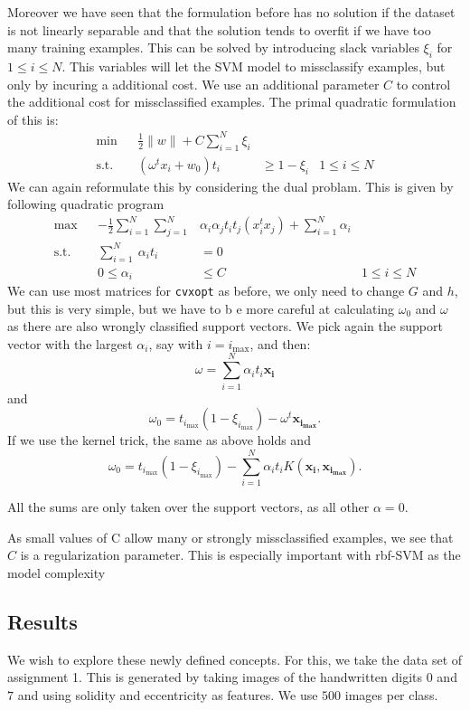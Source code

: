 Moreover we have seen that the formulation before has no solution if the dataset is not linearly separable and that the solution tends to overfit if we have too many training examples. This can be solved by introducing slack variables $\xi_i$ for $1 \leq i \leq N$. This variables will let the SVM model to missclassify examples, but only by incuring a additional cost. We use an additional parameter $C$ to control the additional cost for missclassified examples. The primal quadratic formulation of this is:
\begin{align*}
	\min&&  \frac{1}{2}\lVert w \rVert + C \sum\limits_{i=1}^N \xi_i &\\
	\text{s.t.}&& (\omega^tx_i+w_0)t_i &\geq 1 - \xi_i &1 \leq i \leq N
\end{align*}
We can again reformulate this by considering the dual problam. This is given by following quadratic program
\begin{align*}
	\max&& - \frac{1}{2} \sum\limits_{i=1}^N \sum\limits_{j=1}^N&\alpha_i\alpha_jt_it_j(x_i^tx_j) +  \sum\limits_{i=1}^N \alpha_i &\\
	\text{s.t.}&& \sum\limits_{i=1}^N\ \alpha_i t_i &= 0& \\
	&&0\leq\alpha_i&\leq C& 1\leq i \leq N
\end{align*}
We can use most matrices for \texttt{cvxopt} as before, we only need to change $G$ and $h$, but this is very simple, but we have to b e more careful at calculating $\omega_0$ and $\omega$ as there are also wrongly classified support vectors. We pick again the support vector with the largest $\alpha_i$, say with $i = i_{\max}$, and then:
\[
	\omega = \sum\limits_{i=1}^N\alpha_i t_i \bm{x_i}
\]
and 
\[
	\omega_0 = t_{i_{\max}}(1- \xi_{i_{\max}}) - \omega^t\bm{x_{i_{\max}}}.
\]
If we use the kernel trick, the same as above holds and
\[
	\omega_0 = t_{i_{\max}}(1- \xi_{i_{\max}}) -  \sum\limits_{i=1}^N\alpha_i t_i K(\bm{x_i},\bm{x_{i_{\max}}}).
\]

All the sums are only taken over the support vectors, as all other $\alpha=0$.

As small values of C allow many or strongly missclassified examples, we see that $C$ is a regularization parameter. This is especially important with rbf-SVM as the model complexity 

\subsection{Results} 
We wish to explore these newly defined concepts. For this, we take the data set of assignment 1. This is generated by taking images of the handwritten digits $0$ and $7$ and using solidity and eccentricity as features. We use $500$ images per class. 

